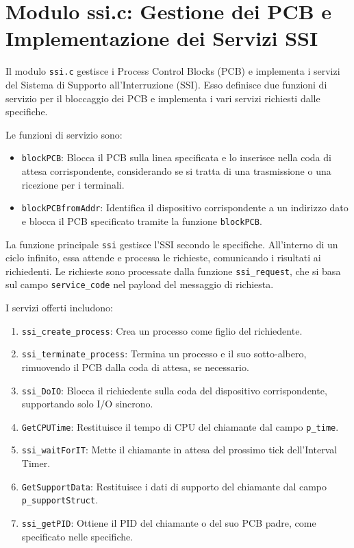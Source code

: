 \documentclass[a4paper]{article}
\begin{document}
\section{Modulo ssi.c: Gestione dei PCB e Implementazione dei Servizi SSI}

Il modulo \texttt{ssi.c} gestisce i Process Control Blocks (PCB) e implementa i servizi del Sistema di Supporto all'Interruzione (SSI). Esso definisce due funzioni di servizio per il bloccaggio dei PCB e implementa i vari servizi richiesti dalle specifiche.

Le funzioni di servizio sono:

\begin{itemize}
\item \texttt{blockPCB}: Blocca il PCB sulla linea specificata e lo inserisce nella coda di attesa corrispondente, considerando se si tratta di una trasmissione o una ricezione per i terminali.

\item \texttt{blockPCBfromAddr}: Identifica il dispositivo corrispondente a un indirizzo dato e blocca il PCB specificato tramite la funzione \texttt{blockPCB}.

\end{itemize}

La funzione principale \texttt{ssi} gestisce l'SSI secondo le specifiche. All'interno di un ciclo infinito, essa attende e processa le richieste, comunicando i risultati ai richiedenti. Le richieste sono processate dalla funzione \verb+ssi_request+, che si basa sul campo \verb+service_code+ nel payload del messaggio di richiesta.

I servizi offerti includono:

\begin{enumerate}
\item \verb+ssi_create_process+: Crea un processo come figlio del richiedente.


\item \texttt{ssi\_terminate\_process}: Termina un processo e il suo sotto-albero, rimuovendo il PCB dalla coda di attesa, se necessario.

\item \texttt{ssi\_DoIO}: Blocca il richiedente sulla coda del dispositivo corrispondente, supportando solo I/O sincrono.

\item \texttt{GetCPUTime}: Restituisce il tempo di CPU del chiamante dal campo \texttt{p\_time}.

\item \texttt{ssi\_waitForIT}: Mette il chiamante in attesa del prossimo tick dell'Interval Timer.

\item \texttt{GetSupportData}: Restituisce i dati di supporto del chiamante dal campo \texttt{p\_supportStruct}.

\item \texttt{ssi\_getPID}: Ottiene il PID del chiamante o del suo PCB padre, come specificato nelle specifiche.

\end{enumerate}
\end{document}
